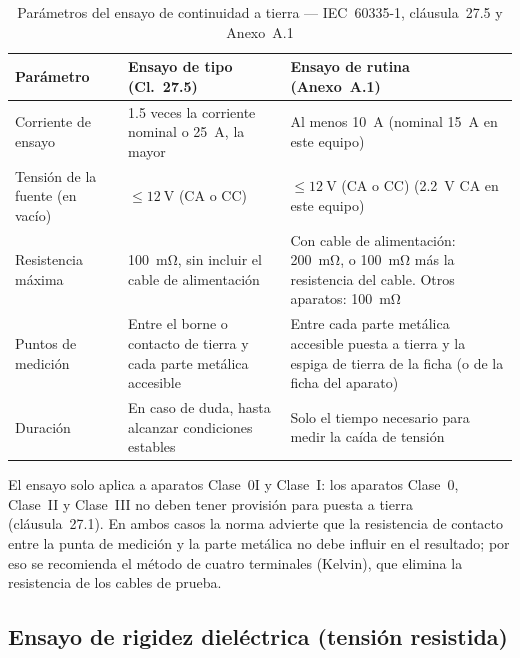 \begin{table}[H]
\centering
\caption{Parámetros del ensayo de continuidad a tierra --- IEC~60335-1, cláusula~27.5 y Anexo~A.1}
\label{tab:tierra_referencia}
\renewcommand{\arraystretch}{1.35}
\begin{tabular}{@{} p{3.4cm} p{4.4cm} p{4.4cm} @{}}
\toprule
\textbf{Parámetro}
    & \textbf{Ensayo de tipo (Cl.~27.5)}
    & \textbf{Ensayo de rutina (Anexo~A.1)} \\
\midrule
Corriente de ensayo
    & \num{1.5} veces la corriente nominal o \SI{25}{\ampere}, la mayor
    & Al menos \SI{10}{\ampere}
      (nominal \SI{15}{\ampere} en este equipo) \\
\addlinespace
Tensión de la fuente (en vacío)
    & $\leq \SI{12}{\volt}$ (CA o CC)
    & $\leq \SI{12}{\volt}$ (CA o CC)
      (\SI{2.2}{\volt} CA en este equipo) \\
\addlinespace
Resistencia máxima
    & \SI{100}{\milli\ohm}, sin incluir el cable de alimentación
    & Con cable de alimentación: \SI{200}{\milli\ohm}, o
      \SI{100}{\milli\ohm} más la resistencia del cable. \newline
      Otros aparatos: \SI{100}{\milli\ohm} \\
\addlinespace
Puntos de medición
    & Entre el borne o contacto de tierra y cada parte metálica accesible
    & Entre cada parte metálica accesible puesta a tierra y la
      espiga de tierra de la ficha (o de la ficha del aparato) \\
\addlinespace
Duración
    & En caso de duda, hasta alcanzar condiciones estables
    & Solo el tiempo necesario para medir la caída de tensión \\
\bottomrule
\end{tabular}
\end{table}

\noindent El ensayo solo aplica a aparatos Clase~0I y Clase~I: los aparatos
Clase~0, Clase~II y Clase~III no deben tener provisión para puesta a tierra
(cláusula~27.1).
En ambos casos la norma advierte que la resistencia de contacto entre la
punta de medición y la parte metálica no debe influir en el resultado;
por eso se recomienda el método de cuatro terminales (Kelvin), que elimina
la resistencia de los cables de prueba.

\subsection{Ensayo de rigidez dieléctrica (tensión resistida)}
\label{subsec:tabla_dielectrica}

